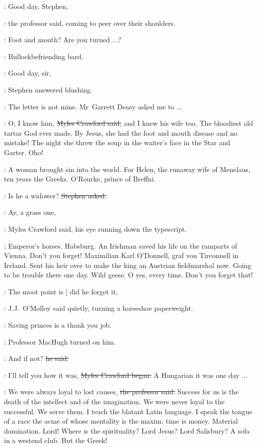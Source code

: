 \machugh:
Good day, Stephen,

:
the professor said,
coming to peer over their shoulders.

\machugh:
Foot and mouth?
Are you turned ...?

\StephenInt:
Bullockbefriending bard.



\Stephen:
Good day, sir,

:
Stephen answered blushing.

\Stephen:
The letter is not mine.
Mr~Garrett Deasy asked me to ...

\crawford:
O, I know him,
\sout{Myles Crawford said,}
and I knew his wife too.
The bloodiest old tartar God ever made.
By Jesus,
she had the foot and mouth disease
and no mistake!
The night she threw the soup in the waiter's face in the Star and Garter.
Oho!

\StephenInt:
A woman brought sin into the world.
For Helen,
the runaway wife of Menelaus,
ten years the Greeks.
O'Rourke,
prince of Breffni.

\Stephen:
Is he a widower?
\sout{Stephen asked.}

\crawford:
Ay, a grass one,

:
Myles Crawford said,
his eye running down the typescript.

\crawford:
Emperor's horses.
Habsburg.
An Irishman saved his life on the ramparts of Vienna.
Don't you forget!
Maximilian Karl O'Donnell,
graf von Tirconnell in Ireland.
Sent his heir over to make the king an Austrian fieldmarshal now.
Going to be trouble there one day.
Wild geese.
O yes, every time.
Don't you forget that!

\jjom:
The moot point is |
did he forget it,

:
J.J.~O'Molloy said quietly,
turning a horseshoe paperweight.

\jjom:
Saving princes is a thank you job.


:
Professor MacHugh turned on him.

\machugh:
And if not?
\sout{he said.}

\crawford:
I'll tell you how it was,
\sout{Myles Crawford began.}
A Hungarian it was one day ...



\machugh:
We were always loyal to lost causes,
\sout{the professor said.}
Success for us is the death of the intellect and of the imagination.
We were never loyal to the successful.
We serve them.
I teach the blatant Latin language.
I speak the tongue of a race the acme of whose mentality is the maxim:
time is money.
Material domination.
Lord!
Where is the spirituality?
Lord Jesus?
Lord Salisbury?
A sofa in a westend club.
But the Greek!


